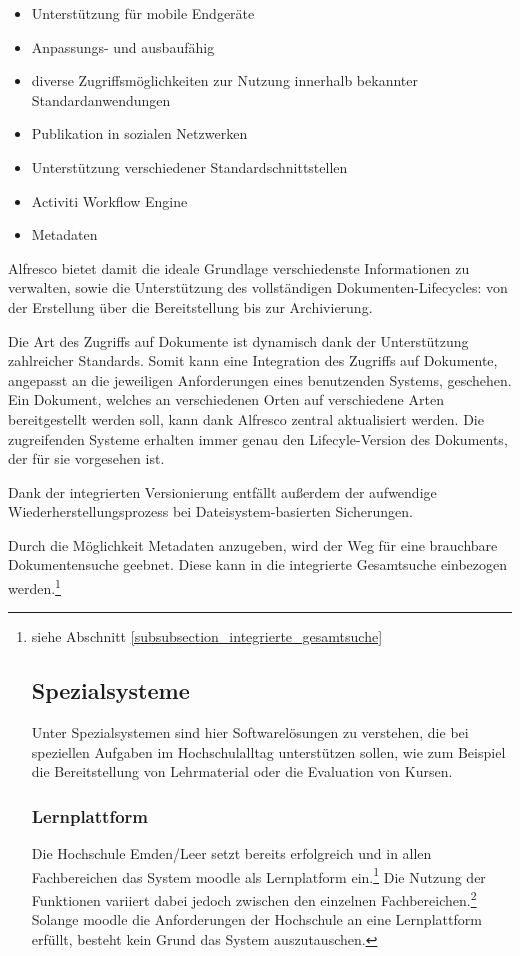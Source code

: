 {\begin{itemize}
	\item Unterstützung für mobile Endgeräte
	\item Anpassungs- und ausbaufähig
	\item diverse Zugriffsmöglichkeiten zur Nutzung innerhalb bekannter Standardanwendungen
	\item Publikation in sozialen Netzwerken
	\item Unterstützung verschiedener Standardschnittstellen
	\item Activiti Workflow Engine
	\item Metadaten
\end{itemize}

Alfresco bietet damit die ideale Grundlage verschiedenste Informationen zu verwalten, sowie die Unterstützung des vollständigen Dokumenten-Lifecycles: von der Erstellung über die Bereitstellung bis zur Archivierung.

Die Art des Zugriffs auf Dokumente ist dynamisch dank der Unterstützung zahlreicher Standards. Somit kann eine Integration des Zugriffs auf Dokumente, angepasst an die jeweiligen Anforderungen eines benutzenden Systems, geschehen. Ein Dokument, welches an verschiedenen Orten auf verschiedene Arten bereitgestellt werden soll, kann dank Alfresco zentral aktualisiert werden. Die zugreifenden Systeme erhalten immer genau den Lifecyle-Version des Dokuments, der für sie vorgesehen ist.

Dank der integrierten Versionierung entfällt außerdem der aufwendige Wiederherstellungsprozess bei Dateisystem-basierten Sicherungen.

Durch die Möglichkeit Metadaten anzugeben, wird der Weg für eine brauchbare Dokumentensuche geebnet. 
Diese kann in die integrierte Gesamtsuche einbezogen werden.\footnote{siehe Abschnitt \ref{subsubsection_integrierte_gesamtsuche}

\subsection{Spezialsysteme}
Unter Spezialsystemen sind hier Softwarelösungen zu verstehen, die bei speziellen Aufgaben im Hochschulalltag unterstützen sollen, wie zum Beispiel die Bereitstellung von Lehrmaterial oder die Evaluation von Kursen.

\subsubsection{Lernplattform}
Die Hochschule Emden/Leer setzt bereits erfolgreich und in allen Fachbereichen das System moodle als Lernplatform ein.\footcite{gunter_muller_interview} 
Die Nutzung der Funktionen variiert dabei jedoch zwischen den einzelnen Fachbereichen.\footnote{siehe Abschnitt \ref{subsection_e-learning}}
Solange moodle die Anforderungen der Hochschule an eine Lernplattform erfüllt, besteht kein Grund das System auszutauschen.

}}
